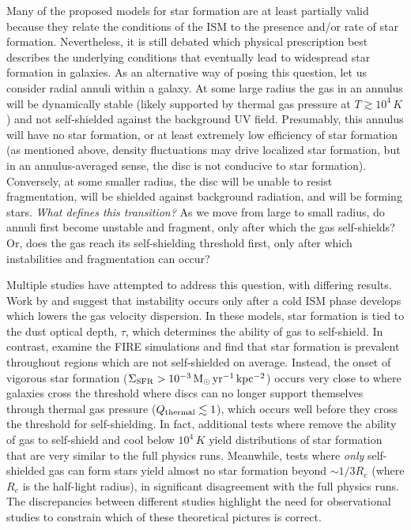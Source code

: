 \documentclass[fleqn,usenatbib]{mnras}
\begin{document}
Many of the proposed models for star formation are at least partially valid because they relate the conditions of the ISM to the presence and/or rate of star formation.  Nevertheless, it is still debated which physical prescription best describes the underlying conditions that eventually lead to widespread star formation in galaxies. As an alternative way of posing this question, let us consider radial annuli within a galaxy. At some large radius the gas in an annulus will be dynamically stable (likely supported by thermal gas pressure at $T \gtrsim 10^4\,K$) and not self-shielded against the background UV field.  Presumably, this annulus will have no star formation, or at least extremely low efficiency of star formation (as mentioned above, density fluctuations may drive localized star formation, but in an annulus-averaged sense, the disc is not conducive to star formation).  Conversely, at some smaller radius, the disc will be unable to resist fragmentation, will be shielded against background radiation, and will be forming stars.  {\it What defines this transition?}  As we move from large to small radius, do annuli first become unstable and fragment,  only after which the gas self-shields?  Or, does the gas reach its self-shielding threshold first, only after which instabilities and fragmentation can occur? 

Multiple studies have attempted to address this question, with differing results.  Work by \citet{Schaye04} and \citet{Krumholz09} suggest that instability occurs only after a cold ISM phase develops which lowers the gas velocity dispersion. In these models, star formation is tied to the dust optical depth, $\tau$, which determines the ability of gas to self-shield.  In contrast, \citet{Orr17} examine the FIRE simulations \citep{Hopkins14} and find that star formation is prevalent throughout regions which are not self-shielded on average.  Instead, the onset of vigorous star formation ($\Sigma_{\rm SFR}>10^{-3}\,{\rm M_{\odot}\,yr^{-1}\,kpc^{-2}}$) occurs very close to where galaxies cross the threshold where discs can no longer support themselves through thermal gas pressure ($Q_{\rm thermal} \lesssim 1$), which occurs well before they cross the threshold for self-shielding. In fact, additional tests where \citet{Orr17} remove the ability of gas to self-shield and cool below $10^4\,K$ yield distributions of star formation that are very similar to the full physics runs.  Meanwhile, tests where {\it only} self-shielded gas can form stars yield almost no star formation beyond $\sim1/3R_e$ (where $R_e$ is the half-light radius), in significant disagreement with the full physics runs. The discrepancies between different studies highlight the need for observational studies to constrain which of these theoretical pictures is correct.
\end{document}
